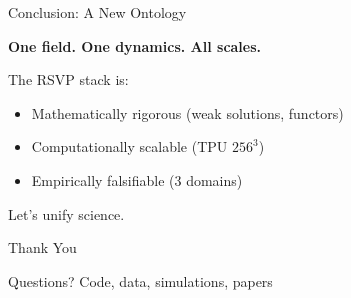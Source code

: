 \documentclass{beamer}
\begin{document}
\begin{frame}{Conclusion: A New Ontology}
\begin{center}
\Large\textbf{One field. One dynamics. All scales.}
\end{center}
\vspace{1em}
\begin{block}{}
The RSVP stack is:
\begin{itemize}
\item \alert{Mathematically rigorous} (weak solutions, functors)
\item \alert{Computationally scalable} (TPU $256^3$)
\item \alert{Empirically falsifiable} (3 domains)
\end{itemize}
\end{block}
\vspace{1em}
\centering
\Large\alert{Let’s unify science.}
\end{frame}

\begin{frame}{Thank You}
\begin{center}
\vspace{1em}
\Large Questions?
\vspace{1em}
\small Code, data, simulations, papers
\end{center}
\end{frame}
\end{document}
